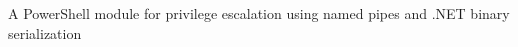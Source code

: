 \begin{project}

  \begin{projectdescription}
    A PowerShell module for privilege escalation using named pipes and .NET binary serialization
  \end{projectdescription}
\end{project}
